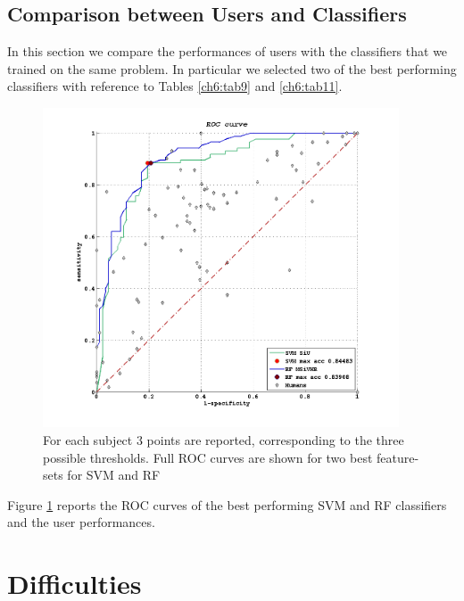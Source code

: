 \vspace{0.5cm}

\subsection{Comparison between Users and Classifiers}

In this section we compare the performances of users with the classifiers that we trained on the same problem. In particular we selected two of the best performing classifiers with 
reference to Tables \ref{ch6:tab9} and \ref{ch6:tab11}.

\begin{figure}[!htb]
   \begin{center}
    \includegraphics[width=0.94\textwidth]{./images/human/class_humans.png}
    \caption[ROC plot humans vs. classifiers]{For each subject 3 points are reported, corresponding to the three possible thresholds.
    Full ROC curves are shown for two best feature-sets for SVM and RF}
    \label{ch6:fig23}
    \end{center}
\end{figure}

Figure \ref{ch6:fig23} reports the \Gls{ROC} curves of the best performing \Gls{SVM} and \Gls{RF} classifiers and the user performances.

\vspace{0.5cm}

\section{Difficulties}

